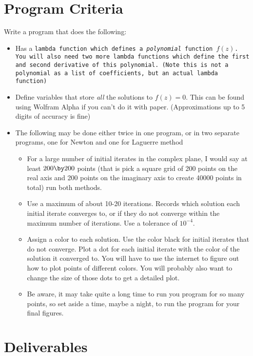 \documentclass{article}
\begin{document}
\section*{Program Criteria}
	Write a program that does the following:
	\begin{itemize}
		\item Has a \tt{lambda} function which defines a \emph{polynomial} function $f(z)$.  You will also  need two more \tt{lambda} functions which define the first and second derivative of this polynomial.  (Note this is not a polynomial as a list of coefficients, but an actual \tt{lambda} function)
		\item Define variables that store \emph{all} the solutions to $f(z) = 0$.  This can be found using Wolfram Alpha if you can't do it with paper. (Approximations up to 5 digits of accuracy is fine)
		\item The following may be done either twice in one program, or in two separate programs, one for Newton and one for Laguerre method
		\begin{itemize}
			\item For a large number of initial iterates in the complex plane, I would say at least $200 \by 200$ points (that is pick a square grid of 200 points on the real axis and 200 points on the imaginary axis to create 40000 points in total) run both methods.
			\item Use a maximum of about 10-20 iterations.  Records which solution each initial iterate converges to, or if they do not converge within the maximum number of iterations. Use a tolerance of $10^{-4}$.
			\item Assign a color to each solution.  Use the color black for initial iterates that do not converge.  Plot a dot for each initial iterate with the color of the solution it converged to.  You will have to use the internet to figure out how to plot points of different colors.  You will probably also want to change the size of those dots to get a detailed plot.
			\item Be aware, it may take quite a long time to run you program for so  many points, so set aside a time, maybe a night, to run the program for your final figures.
		\end{itemize}
	\end{itemize}







\section*{Deliverables}
	
\end{document}
